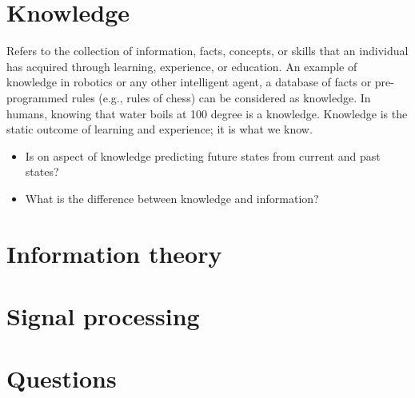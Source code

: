 \documentclass[a4paper]{article}
\begin{document}
        
        \section{Knowledge}
            Refers to the collection of information, facts, concepts, or skills that an individual has acquired through learning, experience, or education. An example of knowledge in robotics or any other intelligent agent, a database of facts or pre-programmed rules (e.g., rules of chess) can be considered as knowledge. In humans, knowing that water boils at 100 degree is a knowledge. Knowledge is the static outcome of learning and experience; it is what we know.
            \begin{itemize}
                \item Is on aspect of knowledge predicting future states from current and past states?
                \item What is the difference between knowledge and information?
            \end{itemize}
        
        
        \section{Information theory}
        
        
        \section{Signal processing}
        
        
        \section{Questions}
\end{document}
